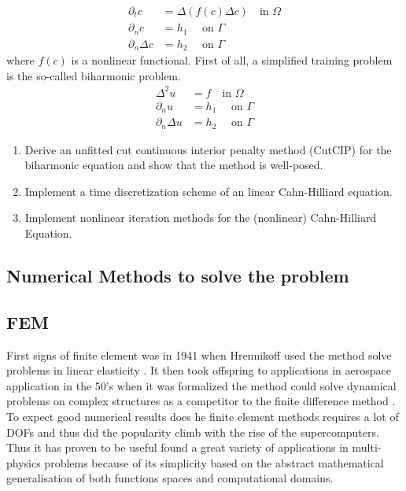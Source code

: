 \[
    \begin{split}
\partial _{t} c &= \Delta ( f(c) \Delta c)     \quad  \text{in } \Omega \\
\partial _{n} c & = h_{1} \quad \text{ on } \Gamma  \\
\partial _{n} \Delta c  & = h_{2} \quad \text{ on } \Gamma
    \end{split}
\]
where $f( c) $ is a nonlinear functional. First of all, a simplified training problem is the so-called biharmonic problem.
\[
    \begin{split}
\Delta ^2 u & = f \quad  \text{in } \Omega \\
\partial _{n} u & = h_{1} \quad \text{ on } \Gamma  \\
\partial _{n} \Delta u  & = h_{2} \quad \text{ on } \Gamma
    \end{split}
\]



\begin{enumerate}[label=(\alph*)]
    \item Derive an unfitted cut continuous interior penalty method (CutCIP) for the biharmonic equation and show that the method is well-posed.
    \item Implement a time discretization scheme of an linear Cahn-Hilliard equation.
    \item Implement nonlinear iteration methods for the (nonlinear) Cahn-Hilliard Equation.
\end{enumerate}


\subsection{Numerical Methods to solve the problem}%
\label{sub:numerical_methods_to_solve_the_problem}


\subsection{FEM}

First signs of finite element was in 1941 when Hrennikoff used the method solve problems in linear elasticity \cite{hrennikoff1941solution}. It then took offspring to applications in aerospace application in the 50's when it was formalized the method
could solve dynamical problems on complex structures as a competitor to the finite difference method
\cite{argyris1960energy, turner1956stiffness, liu2022eighty}. To expect good numerical results does he finite element methods requires a lot of DOFs and thus did the popularity climb with the rise of the supercomputers. Thus it has proven to be
useful found a great
variety of applications in multi-physics problems because of its simplicity based on the abstract mathematical generalisation of both functions spaces and computational domains.

